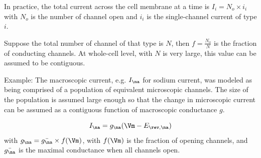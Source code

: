 \begin{mdframed}

In practice, the total current across the cell membrane at a time is
$I_i = N_{o}\times i_i$ with $N_o$ is the number of channel open and $i_i$ is
the single-channel current of type $i$.

Suppose the total number of channel of that type is $N$, then $f=\frac{N_o}{N}$
is the fraction of conducting channels. At whole-cell level, with $N$ is
very large, this value can be assumed to be contiguous.



\end{mdframed}



Example: The macroscopic current, e.g. $I_\na$ for sodium current, was modeled as
being comprised of a population of equivalent microscopic channels. The size of
the population is assumed large enough so that the change in microscopic current
can be assumed as a contiguous function of macroscopic conductance $g$.

\begin{equation}
I_\na = g_\na (\Vm - E_{\rev,\na})
\end{equation}
with $g_\na = \bar{g_\na} \times f(\Vm)$, with $f(\Vm)$ is the fraction of
opening channels, and $\bar{g_\na}$ is the maximal conductance when all
channels open.





%

